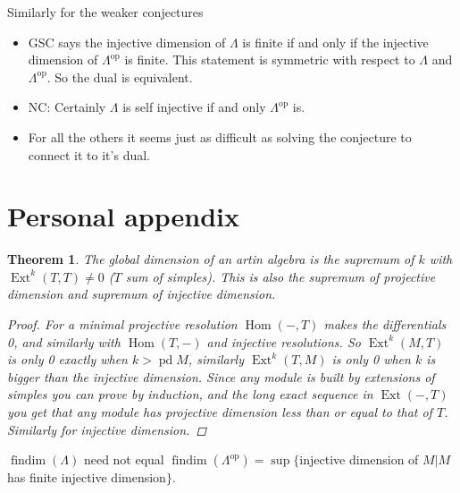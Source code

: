 \documentclass[11pt, a4paper, english]{article}
\newtheorem{theorem}{Theorem}[section]
\theoremstyle{definition}
\DeclareMathOperator{\Hom}{Hom}
\DeclareMathOperator{\Ext}{Ext}
\DeclareMathOperator{\findim}{findim}
\DeclareMathOperator{\pd}{pd}
\begin{document}
Similarly for the weaker conjectures
\begin{itemize}
	\item GSC says the injective dimension of $\Lambda$ is finite if and only if the injective dimension of $\Lambda^{\operatorname{op}}$ is finite. This statement is symmetric with respect to $\Lambda$ and $\Lambda^{\operatorname{op}}$. So the dual is equivalent.
	\item NC: Certainly $\Lambda$ is self injective if and only $\Lambda^{\operatorname{op}}$ is. 
	\item For all the others it seems just as difficult as solving the conjecture to connect it to it's dual.
\end{itemize}


\section{Personal appendix}
\begin{theorem}
	The global dimension of an artin algebra is the supremum of $k$ with $\Ext^k(T,T)\neq 0$ ($T$ sum of simples). This is also the supremum of projective dimension and supremum of injective dimension.
	\begin{proof}
		For a minimal projective resolution $\Hom(-,T)$ makes the differentials 0, and similarly with $\Hom(T,-)$ and injective resolutions. So $\Ext^k(M, T)$ is only 0 exactly when $k>\pd M$, similarly $\Ext^k(T,M)$ is only 0 when $k$ is bigger than the injective dimension. Since any module is built by extensions of simples you can prove by induction, and the long exact sequence in $\Ext(-,T)$ you get that any module has projective dimension less than or equal to that of $T$. Similarly for injective dimension.
	\end{proof}
\end{theorem}

$\findim(\Lambda)$ need not equal $\findim(\Lambda^{\operatorname{op}}) = \sup\{ $injective dimension of $M | M$ has finite injective dimension$ \}$.
\end{document}

